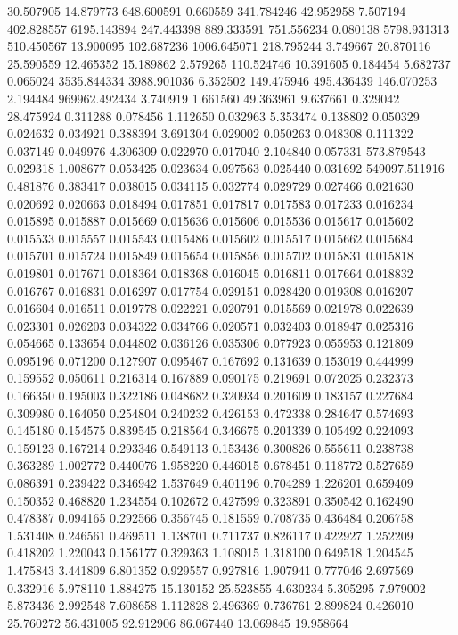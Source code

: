 30.507905
14.879773
648.600591
0.660559
341.784246
42.952958
7.507194
402.828557
6195.143894
247.443398
889.333591
751.556234
0.080138
5798.931313
510.450567
13.900095
102.687236
1006.645071
218.795244
3.749667
20.870116
25.590559
12.465352
15.189862
2.579265
110.524746
10.391605
0.184454
5.682737
0.065024
3535.844334
3988.901036
6.352502
149.475946
495.436439
146.070253
2.194484
969962.492434
3.740919
1.661560
49.363961
9.637661
0.329042
28.475924
0.311288
0.078456
1.112650
0.032963
5.353474
0.138802
0.050329
0.024632
0.034921
0.388394
3.691304
0.029002
0.050263
0.048308
0.111322
0.037149
0.049976
4.306309
0.022970
0.017040
2.104840
0.057331
573.879543
0.029318
1.008677
0.053425
0.023634
0.097563
0.025440
0.031692
549097.511916
0.481876
0.383417
0.038015
0.034115
0.032774
0.029729
0.027466
0.021630
0.020692
0.020663
0.018494
0.017851
0.017817
0.017583
0.017233
0.016234
0.015895
0.015887
0.015669
0.015636
0.015606
0.015536
0.015617
0.015602
0.015533
0.015557
0.015543
0.015486
0.015602
0.015517
0.015662
0.015684
0.015701
0.015724
0.015849
0.015654
0.015856
0.015702
0.015831
0.015818
0.019801
0.017671
0.018364
0.018368
0.016045
0.016811
0.017664
0.018832
0.016767
0.016831
0.016297
0.017754
0.029151
0.028420
0.019308
0.016207
0.016604
0.016511
0.019778
0.022221
0.020791
0.015569
0.021978
0.022639
0.023301
0.026203
0.034322
0.034766
0.020571
0.032403
0.018947
0.025316
0.054665
0.133654
0.044802
0.036126
0.035306
0.077923
0.055953
0.121809
0.095196
0.071200
0.127907
0.095467
0.167692
0.131639
0.153019
0.444999
0.159552
0.050611
0.216314
0.167889
0.090175
0.219691
0.072025
0.232373
0.166350
0.195003
0.322186
0.048682
0.320934
0.201609
0.183157
0.227684
0.309980
0.164050
0.254804
0.240232
0.426153
0.472338
0.284647
0.574693
0.145180
0.154575
0.839545
0.218564
0.346675
0.201339
0.105492
0.224093
0.159123
0.167214
0.293346
0.549113
0.153436
0.300826
0.555611
0.238738
0.363289
1.002772
0.440076
1.958220
0.446015
0.678451
0.118772
0.527659
0.086391
0.239422
0.346942
1.537649
0.401196
0.704289
1.226201
0.659409
0.150352
0.468820
1.234554
0.102672
0.427599
0.323891
0.350542
0.162490
0.478387
0.094165
0.292566
0.356745
0.181559
0.708735
0.436484
0.206758
1.531408
0.246561
0.469511
1.138701
0.711737
0.826117
0.422927
1.252209
0.418202
1.220043
0.156177
0.329363
1.108015
1.318100
0.649518
1.204545
1.475843
3.441809
6.801352
0.929557
0.927816
1.907941
0.777046
2.697569
0.332916
5.978110
1.884275
15.130152
25.523855
4.630234
5.305295
7.979002
5.873436
2.992548
7.608658
1.112828
2.496369
0.736761
2.899824
0.426010
25.760272
56.431005
92.912906
86.067440
13.069845
19.958664
